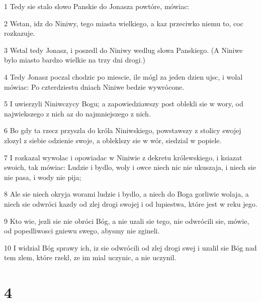 \par 1 Tedy sie stalo slowo Panskie do Jonasza powtóre, mówiac:
\par 2 Wstan, idz do Niniwy, tego miasta wielkiego, a kaz przeciwko niemu to, coc rozkazuje.
\par 3 Wstal tedy Jonasz, i poszedl do Niniwy wedlug slowa Panskiego. (A Niniwe bylo miasto bardzo wielkie na trzy dni drogi.)
\par 4 Tedy Jonasz poczal chodzic po miescie, ile mógl za jeden dzien ujsc, i wolal mówiac: Po czterdziestu dniach Niniwe bedzie wywrócone.
\par 5 I uwierzyli Niniwczycy Bogu; a zapowiedziawszy post oblekli sie w wory, od najwiekszego z nich az do najmniejszego z nich.
\par 6 Bo gdy ta rzecz przyszla do króla Niniwskiego, powstawszy z stolicy swojej zlozyl z siebie odzienie swoje, a obleklszy sie w wór, siedzial w popiele.
\par 7 I rozkazal wywolac i opowiadac w Niniwie z dekretu królewskiego, i ksiazat swoich, tak mówiac: Ludzie i bydlo, woly i owce niech nic nie ukuszaja, i niech sie nie pasa, i wody nie pija;
\par 8 Ale sie niech okryja worami ludzie i bydlo, a niech do Boga gorliwie wolaja, a niech sie odwróci kazdy od zlej drogi swojej i od lupiestwa, które jest w reku jego.
\par 9 Kto wie, jezli sie nie obróci Bóg, a nie uzali sie tego, nie odwrócili sie, mówie, od popedliwosci gniewu swego, abysmy nie zgineli.
\par 10 I widzial Bóg sprawy ich, iz sie odwrócili od zlej drogi swej i uzalil sie Bóg nad tem zlem, które rzekl, ze im mial uczynic, a nie uczynil.

\chapter{4}

